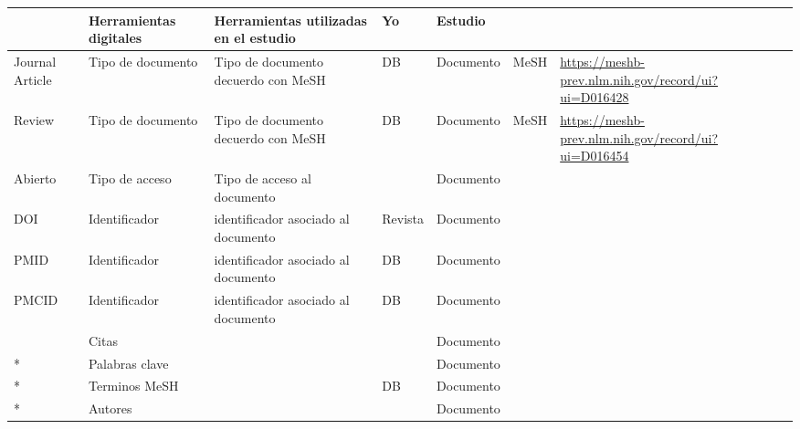 \begin{longtable}{|p{2cm}|p{2cm}|p{2cm}|p{1.2cm}|p{1.9cm}|p{1.5cm}|p{2.1cm}|}
                  & Herramientas digitales     & Herramientas utilizadas en el estudio    & Yo             & Estudio          &                &                                                     \\ \hline
Journal Article   & Tipo de documento          & Tipo de documento decuerdo con MeSH      & DB             & Documento        & MeSH           & \url{https://meshb-prev.nlm.nih.gov/record/ui?ui=D016428} \\ \hline
Review            & Tipo de documento          & Tipo de documento decuerdo con MeSH      & DB             & Documento        & MeSH           & \url{https://meshb-prev.nlm.nih.gov/record/ui?ui=D016454} \\ \hline
Abierto           & Tipo de acceso             & Tipo de acceso al documento              &                & Documento        &                &                                                     \\ \hline
DOI               & Identificador              & identificador asociado al documento      & Revista        & Documento        &                &                                                     \\ \hline
PMID              & Identificador              & identificador asociado al documento      & DB             & Documento        &                &                                                     \\ \hline
PMCID             & Identificador              & identificador asociado al documento      & DB             & Documento        &                &                                                     \\ \hline
                  & Citas                      &                                          &                & Documento        &                &                                                     \\ \hline
    *             & Palabras clave             &                                          &                & Documento        &                &                                                     \\ \hline
    *             & Terminos MeSH              &                                          & DB             & Documento        &                &                                                     \\ \hline
    *             & Autores                    &                                          &                & Documento        &                &                                                     \\ \hline

\end{longtable}
